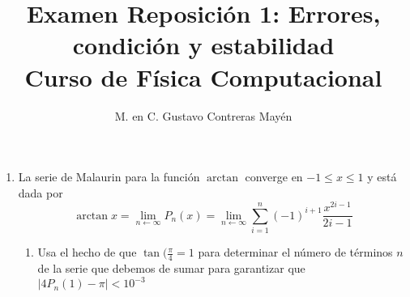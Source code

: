 \documentclass[11pt]{article}
\title{Examen Reposición 1: Errores, condición y estabilidad \\ Curso de Física Computacional}
\author{M. en C. Gustavo Contreras Mayén}
\date{ }
\begin{document}
\maketitle
\fontsize{14}{14}\selectfont
\begin{enumerate}
\item La serie de Malaurin para la función $\arctan$ converge en $-1 \leq x \leq 1$ y está dada por
\[ \arctan x = \lim_{n\leftarrow \infty} P_{n} (x) = \lim_{n\leftarrow \infty} \sum_{i=1}^{n} (-1)^{i+1} \dfrac{x^{2i-1}}{2i-1}	\]
\begin{enumerate}
\item Usa el hecho de que $\tan (\frac{\pi}{4}=1$ para determinar el número de términos $n$ de la serie que debemos de sumar para garantizar que $\vert 4 P_{n}(1) - \pi \vert < 10^{-3}$
\end{enumerate}
\end{enumerate}
\end{document}
